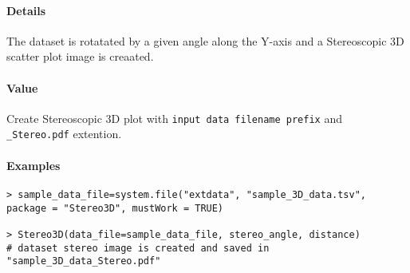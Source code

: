 \documentclass[]{article}
\let\oldparagraph\paragraph
\renewcommand{\paragraph}[1]{\oldparagraph{#1}\mbox{}}
\begin{document}
\paragraph{\texorpdfstring{\textbf{Details}}{Details}}\label{details}

The dataset is rotatated by a given angle along the Y-axis and a
Stereoscopic 3D scatter plot image is creaated.

\paragraph{\texorpdfstring{\textbf{Value}}{Value}}\label{value}

Create Stereoscopic 3D plot with \texttt{input\ data\ filename\ prefix}
and \texttt{\_Stereo.pdf} extention.

\paragraph{\texorpdfstring{\textbf{Examples}}{Examples}}\label{examples}

\begin{verbatim}
> sample_data_file=system.file("extdata", "sample_3D_data.tsv", package = "Stereo3D", mustWork = TRUE)

> Stereo3D(data_file=sample_data_file, stereo_angle, distance)
# dataset stereo image is created and saved in "sample_3D_data_Stereo.pdf"
\end{verbatim}


\end{document}
